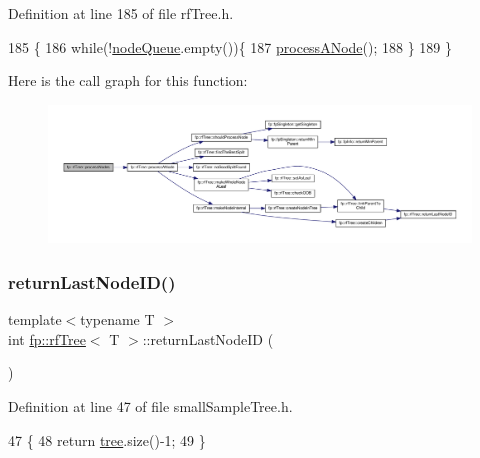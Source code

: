 Definition at line 185 of file rf\+Tree.\+h.


\begin{DoxyCode}
185                                    \{
186                     \textcolor{keywordflow}{while}(!\hyperlink{classfp_1_1rfTree_af72d0a2f930fd480dfb4858885c2df23}{nodeQueue}.empty())\{
187                         \hyperlink{classfp_1_1rfTree_ab7760333f6857ab7ce2ee29a7bc16e65}{processANode}();
188                     \}
189                 \}
\end{DoxyCode}
Here is the call graph for this function\+:
\nopagebreak
\begin{figure}[H]
\begin{center}
\leavevmode
\includegraphics[width=350pt]{classfp_1_1rfTree_a7997df3477bc9f73163384c8cd0bcec9_cgraph}
\end{center}
\end{figure}
\mbox{\label{classfp_1_1rfTree_a1b8c04f3f3ce362d9627c2ca66d10efd}} 
\subsubsection{\texorpdfstring{return\+Last\+Node\+I\+D()}{returnLastNodeID()}\hspace{0.1cm}{\footnotesize\ttfamily [1/2]}}
{\footnotesize\ttfamily template$<$typename T $>$ \\
int \hyperlink{classfp_1_1rfTree}{fp\+::rf\+Tree}$<$ T $>$\+::return\+Last\+Node\+ID (\begin{DoxyParamCaption}{ }\end{DoxyParamCaption})\hspace{0.3cm}{\ttfamily [inline]}}



Definition at line 47 of file small\+Sample\+Tree.\+h.


\begin{DoxyCode}
47                                              \{
48                     \textcolor{keywordflow}{return} \hyperlink{classtree}{tree}.size()-1;
49                 \}
\end{DoxyCode}
\mbox{\label{classfp_1_1rfTree_a1b8c04f3f3ce362d9627c2ca66d10efd}} 
